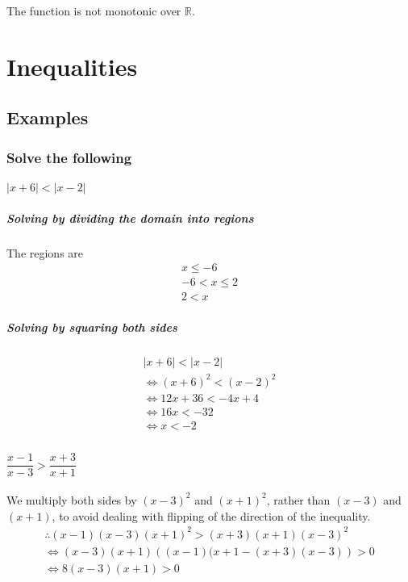 \documentclass[fleqn]{article}
\begin{document}
The function is not monotonic over $\mathbb{R}$.

\newpage
\section{Inequalities}

\subsection{Examples}

\subsubsection{Solve the following}

\paragraph{$\lvert x + 6 \rvert < \lvert x - 2 \rvert$\\}
\subparagraph{Solving by dividing the domain into regions\\}
The regions are
\begin{align*}
	x \leq -6\\
	-6 < x \leq 2\\
	2 < x
\end{align*}

\subparagraph{Solving by squaring both sides}

\begin{align*}
	\lvert x + 6 \rvert < \lvert x -2 \rvert \\
	\Leftrightarrow (x+6)^2 < (x-2)^2 \\
	\Leftrightarrow 12x + 36 < -4x +4 \\
	\Leftrightarrow 16x < -32 \\
	\Leftrightarrow x < -2 \\
\end{align*}

\paragraph{$\dfrac{x-1}{x-3} > \dfrac{x+3}{x+1}$\\}

We multiply both sides by $(x-3)^2$ and $(x+1)^2$, rather than $(x-3)$ and $(x+1)$, to avoid dealing with flipping of the direction of the inequality.\\

\begin{align*}
	\therefore (x-1)(x-3)(x+1)^2 > (x+3)(x+1)(x-3)^2 \\
	\Leftrightarrow (x-3)(x+1)\left((x-1)(x+1 - (x+3)(x-3)\right) > 0 \\
	\Leftrightarrow 8(x-3)(x+1) > 0
\end{align*}
\end{document}

